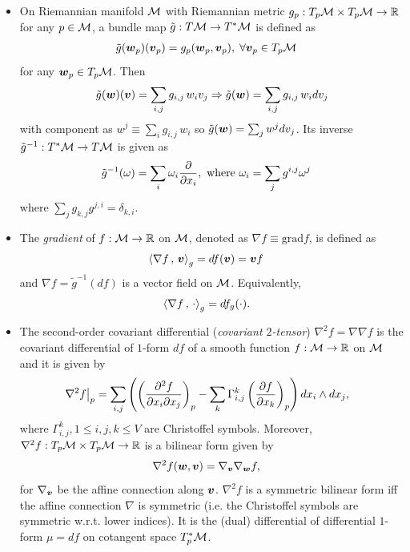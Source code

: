 \documentclass[11pt]{article}
\begin{document}
\begin{itemize}
\item On Riemannian manifold ${\mathcal M}$ with Riemannian metric $g_{p}: T_{p}{\mathcal M} \times T_{p}{\mathcal M} \rightarrow {\mathbb R}$ for any $p\in {\mathcal M}$, a bundle map $\tilde{g}: T{\mathcal M} \rightarrow T^{*}{\mathcal M}$ is defined as
\begin{align*}
\tilde{g}(\boldsymbol{w}_{p})(\boldsymbol{v}_{p}) &= g_{p}(\boldsymbol{w}_{p},\boldsymbol{v}_{p} ), \; \forall \boldsymbol{v}_{p}\in T_{p}{\mathcal M}
\end{align*} for any $\boldsymbol{w}_{p}\in T_{p}{\mathcal M}$. Then 
\begin{align*}
\tilde{g}(\boldsymbol{w})(\boldsymbol{v}) = \sum_{i,j}g_{i,j}\,w_{i}v_{j}  \Rightarrow \tilde{g}(\boldsymbol{w}) = \sum_{i,j}g_{i,j}\,w_{i}dv_{j}
\end{align*} with component as
$
w^{j}\equiv \sum_{i}g_{i,j}\,w_{i}
$ so $ \tilde{g}(\boldsymbol{w}) = \sum_{j}w^{j}dv_{j}$. Its inverse $\tilde{g}^{-1}: T^{*}{\mathcal M} \rightarrow T{\mathcal M}$ is given as
\begin{align*}
\tilde{g}^{-1}(\omega) &= \sum_{i}\omega_{i} \frac{\partial }{ \partial x_{i}}, \text{ where }  \omega_{i} = \sum_{j}g^{i,j}\omega^{j}
\end{align*} where $\sum_{j}g_{k,j}g^{j,i} = \delta_{k,i}$.\\

\item The \emph{gradient} of $f: {\mathcal M}\rightarrow {\mathbb R}$ on ${\mathcal M}$, denoted as $\nabla f \equiv \text{grad} f$, is defined as 
\begin{align*}
\left\langle \nabla f\,,\, \boldsymbol{v} \right\rangle_{g} &= df(\boldsymbol{v}) = \boldsymbol{v}f
\end{align*} and $\nabla f = \tilde{g}^{-1}(df)$ is a vector field on ${\mathcal M}$. Equivalently, 
\begin{align*}
\left\langle \nabla f\,,\, \cdot \right\rangle_{g} &= df_{g}(\cdot). 
\end{align*}

\item The second-order covariant differential (\emph{covariant $2$-tensor}) $\nabla^{2}f = \nabla \nabla f$ is the covariant differential of $1$-form $df$ of a smooth function $f: {\mathcal M}\rightarrow {\mathbb R}$ on ${\mathcal M}$ and it is given by 
\begin{align*}
\left.{\nabla^{2}f}\right\vert_{p} &= \sum_{i,j}\left(\left(\frac{\partial ^{2}f}{ \partial x_{i}\partial x_{j}}\right)_{p} - \sum_{k}\Gamma_{i,j}^{k}\left(\frac{\partial f}{ \partial x_{k}}\right)_p\right)dx_{i}\wedge dx_{j},
\end{align*}  where $\Gamma_{i,j}^{k}, 1 \le i,j,k \le V$ are Christoffel symbols.  Moreover,  $\nabla^{2}f: T_{p}{\mathcal M} \times T_{p}{\mathcal M} \rightarrow {\mathbb R}$ is a bilinear form given by  
\begin{align*}
\nabla^{2}f(\boldsymbol{w}, \boldsymbol{v}) &= \nabla_{\boldsymbol{v}}\nabla_{\boldsymbol{w}}f,
\end{align*} for $\nabla_{\boldsymbol{v}}$ be the affine connection along $\boldsymbol{v}$. $\nabla^{2}f$ is a symmetric bilinear form iff the affine connection $\nabla$ is symmetric (i.e. the Christoffel symbols are  symmetric w.r.t. lower indices). It is the (dual) differential of differential $1$-form $\mu = df$ on cotangent space $T_{p}^{*}{\mathcal M}$.
\end{itemize}
\end{document}
